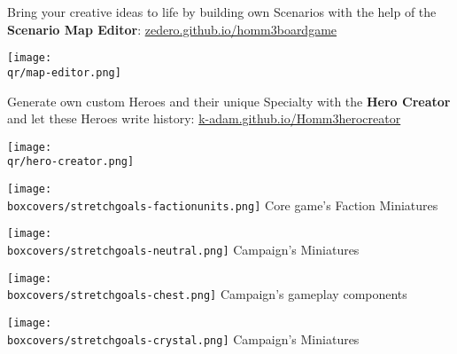 \begin{multicols}{2}
\begin{itemize}
    \begin{minipage}{5cm}
        \item Bring your creative ideas to life by building own Scenarios with the help of the \textbf{Scenario Map Editor}:
        {\footnotesize \href{https://zedero.github.io/homm3boardgame/}{zedero.github.io/homm3boardgame}}
    \end{minipage}
    \hfill
    \begin{minipage}{2cm}
        \begin{center}
            \texttt{[image: \\qr/map-editor.png]}
            \scriptsize {}
        \end{center}
    \end{minipage}\par
    \smallskip
    \begin{minipage}{5cm}
    \item Generate own custom Heroes and their unique Specialty with the \textbf{Hero Creator} and let these Heroes write history:
      \mbox{\footnotesize \href{https://k-adam.github.io/Homm3_hero_creator}{k-adam.github.io/Homm3\textunderscore{}hero\textunderscore{}creator}}
    \end{minipage}
    \hfill
    \begin{minipage}{2cm}
        \begin{center}
            \texttt{[image: \\qr/hero-creator.png]}
            \scriptsize {}
        \end{center}
    \end{minipage}\par
  \end{itemize}
\end{multicols}
\begin{multicols}{4}
    \begin{center}
        \texttt{[image: \\boxcovers/stretchgoals-factionunits.png]}\newline
        \footnotesize Core game's Faction Miniatures\par
        \columnbreak
        \texttt{[image: \\boxcovers/stretchgoals-neutral.png]}\newline
        \footnotesize {} Campaign's Miniatures\par
        \columnbreak
        \texttt{[image: \\boxcovers/stretchgoals-chest.png]}\newline
        \footnotesize {} Campaign's gameplay components\par
        \columnbreak
        \texttt{[image: \\boxcovers/stretchgoals-crystal.png]}\newline
        \footnotesize {} Campaign's Miniatures\par
    \end{center}
\end{multicols}
